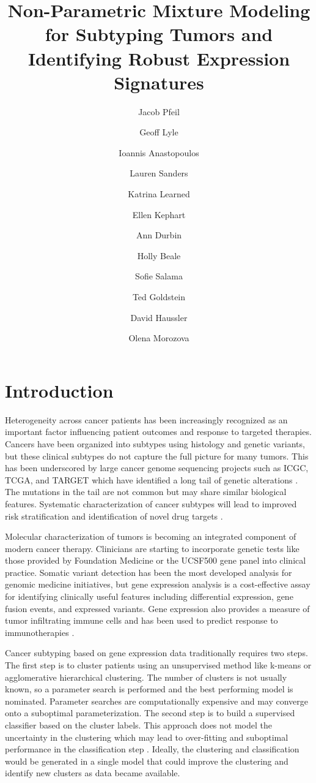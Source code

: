 \documentclass[fleqn,10pt]{wlscirep}
\title{Non-Parametric Mixture Modeling for Subtyping Tumors and Identifying Robust Expression Signatures}
\author[1,*]{Jacob Pfeil}
\author[1]{Geoff Lyle}
\author[1]{Ioannis Anastopoulos}
\author[1]{Lauren Sanders}
\author[1]{Katrina Learned}
\author[1]{Ellen Kephart}
\author[1]{Ann Durbin}
\author[1]{Holly Beale}
\author[1]{Sofie Salama}
\author[1,2]{Ted Goldstein}
\author[1]{David Haussler}
\author[1]{Olena Morozova}
\affil[1]{University of California, Santa Cruz, Biomolecular Engineering, Santa Cruz, 95064, United States}
\affil[2]{University of California, San Francisco}
\affil[*]{jpfeil@ucsc.edu}
\begin{document}
\flushbottom
\maketitle
%
%
\thispagestyle{empty}


\section*{Introduction}

Heterogeneity across cancer patients has been increasingly recognized as an important factor influencing patient outcomes and response to targeted therapies. Cancers have been organized into subtypes using histology and genetic variants, but these clinical subtypes do not capture the full picture for many tumors. This has been underscored by large cancer genome sequencing projects such as ICGC, TCGA, and TARGET which have identified a long tail of genetic alterations \cite{armenia2018long}. The mutations in the tail are not common but may share similar biological features. Systematic characterization of cancer subtypes will lead to improved risk stratification and identification of novel drug targets \cite{zhao2018molecular}.

Molecular characterization of tumors is becoming an integrated component of modern cancer therapy. Clinicians are starting to incorporate genetic tests like those provided by Foundation Medicine or the UCSF500 gene panel into clinical practice. Somatic variant detection has been the most developed analysis for genomic medicine initiatives, but gene expression analysis is a cost-effective assay for identifying clinically useful features including differential expression, gene fusion events, and expressed variants. Gene expression also provides a measure of tumor infiltrating immune cells and has been used to predict response to immunotherapies \cite{auslander2018robust}.

Cancer subtyping based on gene expression data traditionally requires two steps. The first step is to cluster patients using an unsupervised method like k-means or agglomerative hierarchical clustering. The number of clusters is not usually known, so a parameter search is performed and the best performing model is nominated. Parameter searches are computationally expensive and may converge onto a suboptimal parameterization. The second step is to build a supervised classifier based on the cluster labels. This approach does not model the uncertainty in the clustering which may lead to over-fitting and suboptimal performance in the classification step \cite{zhao2018molecular}. Ideally, the clustering and classification would be generated in a single model that could improve the clustering and identify new clusters as data became available.
\end{document}
